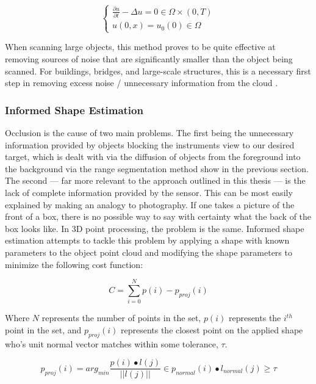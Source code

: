 \documentclass[12pt]{drexelthesis}
\let\Oldsubsubsection\subsubsection
\renewcommand{\subsubsection}{\FloatBarrier\Oldsubsubsection}
\begin{document}
\begin{equation}
		\begin{cases}
			\frac{\partial u}{\partial t} - \Delta u = 0 \in \Omega \times (0,T) \\
			u(0,x) = u_{0}(0) \in \Omega
		\end{cases}
\end{equation}

When scanning large objects, this method proves to be quite effective at removing sources of noise that are significantly smaller than the object being scanned. For buildings, bridges, and large-scale structures, this is a necessary first step in removing excess noise / unnecessary information from the cloud \cite{RN13}.

\subsubsection{Informed Shape Estimation}
Occlusion is the cause of two main problems. The first being the unnecessary information provided by objects blocking the instruments view to our desired target, which is dealt with via the diffusion of objects from the foreground into the background via the range segmentation method show in the previous section. The second --- far more relevant to the approach outlined in this thesis --- is the lack of complete information provided by the sensor. This can be most easily explained by making an analogy to photography. If one takes a picture of the front of a box, there is no possible way to say with certainty what the back of the box looks like. In 3D point processing, the problem is the same. Informed shape estimation attempts to tackle this problem by applying a shape with known parameters to the object point cloud and modifying the shape parameters to minimize the following cost function:

\begin{equation}
	C = \sum_{i=0}^{N}{p(i) - p_{proj}(i)}
\end{equation}

Where $N$ represents the number of points in the set, $p(i)$ represents the $i^{th}$ point in the set, and $p_{proj}(i)$ represents the closest point on the applied shape who's unit normal vector matches within some tolerance, $\tau$.

\begin{equation}
	p_{proj}(i) = arg_{min} \frac{p(i) \bullet l(j)}{||l(j)||} \in p_{normal}(i) \bullet l_{normal}(j) \geq \tau
\end{equation}
\end{document}
